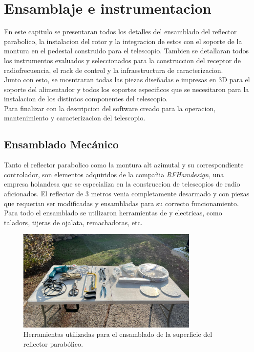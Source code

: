 \chapter{Ensamblaje e instrumentacion}

En este capitulo se presentaran todos los detalles del ensamblado del reflector parabolico, la instalacion del rotor y la integracion de estos con el soporte de la montura en el pedestal construido para el telescopio. Tambien se detallaran todos los instrumentos evaluados y seleccionados para la construccion del receptor de radiofrecuencia, el rack de control y la infraestructura de caracterizacion.\\

Junto con esto, se mosntraran todas las piezas diseñadas e impresas en 3D para el soporte del alimentador y todos los soportes especificos que se necesitaron para la instalacion de los distintos componentes del telescopio.\\

Para finalizar con la descripcion del software creado para la operacion, mantenimiento y caracterizacion del telescopio.\\

\section{Ensamblado Mecánico}

Tanto el reflector parabolico como la montura alt azimutal y su correspondiente controlador, son elementos adquiridos de la compañia \textit{RFHamdesign}, una empresa holandesa que se especializa en la construccion de telescopios de radio aficionados. El reflector de 3 metros venia completamente desarmado y con piezas que requerian ser modificadas y ensambladas para su correcto funcionamiento.\\

Para todo el ensamblado se utilizaron herramientas de y electricas, como taladors, tijeras de ojalata, remachadoras, etc.\\

\begin{figure}
    \centering
    \includegraphics[width=0.8\textwidth]{img/herramientas}
    \caption{Herramientas utilizadas para el ensamblado de la superficie del reflector parabólico.}
    \label{fig:ensamblado1}
\end{figure}

